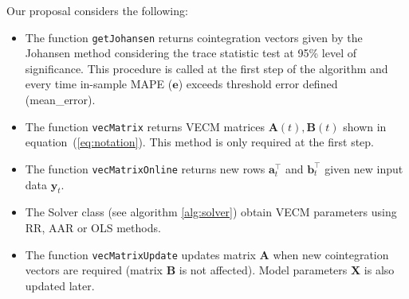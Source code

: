 Our proposal considers the following:

\begin{itemize}
\item The function \texttt{getJohansen} returns cointegration vectors given by the
Johansen method considering the trace statistic test at 95\% level of
significance. This procedure is called at the first step of the algorithm and
every time in-sample MAPE ($\mathbf{e}$) exceeds threshold error defined (mean\_error).
\item The function \texttt{vecMatrix} returns VECM
matrices $\mathbf{A}(t),\mathbf{B}(t)$ shown in equation~(\ref{eq:notation}). This
method is only required at the first step.
\item The function \texttt{vecMatrixOnline} returns new rows $\mathbf{a}_t^\top$ and
$\mathbf{b}_t^\top$ given new input data $\mathbf{y}_t$.
\item The Solver class (see algorithm \ref{alg:solver}) obtain VECM parameters  
using RR, AAR or OLS methods.
\item The function \texttt{vecMatrixUpdate} updates matrix $\mathbf{A}$ when new
cointegration vectors are required (matrix $\mathbf{B}$ is not affected). Model
parameters $\mathbf{X}$ is also updated later.
\end{itemize}




